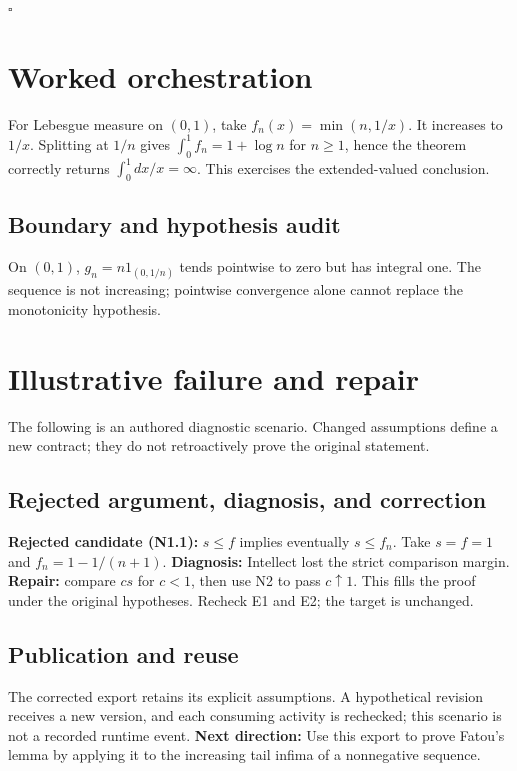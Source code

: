 \documentclass[preprint,12pt,aps,pra,showkeys,amsmath,amssymb,superscriptaddress,floatfix]{revtex4-2}
\theoremstyle{definition}
\theoremstyle{remark}
\begin{document}
\hfill$\square$

\section{Worked orchestration}

For Lebesgue measure on \((0,1)\), take \(f_n(x)=\min(n,1/x)\). It
increases to \(1/x\). Splitting at \(1/n\) gives
\(\int_0^1 f_n=1+\log n\) for \(n\ge1\), hence the theorem correctly
returns \(\int_0^1 dx/x=\infty\). This exercises the extended-valued
conclusion.

\subsection{Boundary and hypothesis audit}

On \((0,1)\), \(g_n=n1_{(0,1/n)}\) tends pointwise to zero but has
integral one. The sequence is not increasing; pointwise convergence
alone cannot replace the monotonicity hypothesis.

\section{Illustrative failure and repair}

The following is an authored diagnostic scenario. Changed assumptions
define a new contract; they do not retroactively prove the original
statement.

\subsection{Rejected argument, diagnosis, and correction}
\textbf{Rejected candidate (N1.1):} \(s\le f\) implies eventually
\(s\le f_n\). Take \(s=f=1\) and \(f_n=1-1/(n+1)\). \textbf{Diagnosis:}
Intellect lost the strict comparison margin. \textbf{Repair:} compare
\(cs\) for \(c<1\), then use N2 to pass \(c\uparrow1\). This fills the
proof under the original hypotheses. Recheck E1 and E2; the target is
unchanged.

\subsection{Publication and reuse}
The corrected export retains its explicit assumptions. A hypothetical
revision receives a new version, and each consuming activity is
rechecked; this scenario is not a recorded runtime event. \textbf{Next
direction:} Use this export to prove Fatou's lemma by applying it to the
increasing tail infima of a nonnegative sequence.
\end{document}
